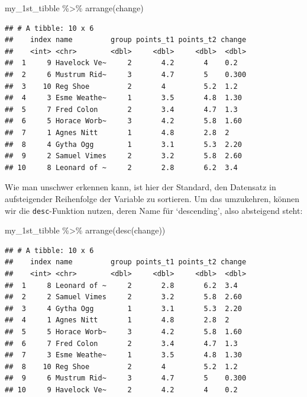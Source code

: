 \documentclass[
]{book}
\newenvironment{Shaded}{\begin{snugshade}}{\end{snugshade}}
\newcommand{\FunctionTok}[1]{\textcolor[rgb]{0.00,0.00,0.00}{#1}}
\newcommand{\NormalTok}[1]{#1}
\newcommand{\SpecialCharTok}[1]{\textcolor[rgb]{0.00,0.00,0.00}{#1}}
\begin{document}
\begin{Shaded}
\begin{Highlighting}[]
\NormalTok{my\_1st\_tibble }\SpecialCharTok{\%\textgreater{}\%} 
  \FunctionTok{arrange}\NormalTok{(change)}
\end{Highlighting}
\end{Shaded}

\begin{verbatim}
## # A tibble: 10 x 6
##    index name         group points_t1 points_t2 change
##    <int> <chr>        <dbl>     <dbl>     <dbl>  <dbl>
##  1     9 Havelock Ve~     2       4.2       4    0.2  
##  2     6 Mustrum Rid~     3       4.7       5    0.300
##  3    10 Reg Shoe         2       4         5.2  1.2  
##  4     3 Esme Weathe~     1       3.5       4.8  1.30 
##  5     7 Fred Colon       2       3.4       4.7  1.3  
##  6     5 Horace Worb~     3       4.2       5.8  1.60 
##  7     1 Agnes Nitt       1       4.8       2.8  2    
##  8     4 Gytha Ogg        1       3.1       5.3  2.20 
##  9     2 Samuel Vimes     2       3.2       5.8  2.60 
## 10     8 Leonard of ~     2       2.8       6.2  3.4
\end{verbatim}

Wie man unschwer erkennen kann, ist hier der Standard, den Datensatz in aufsteigender Reihenfolge der Variable zu sortieren. Um das umzukehren, können wir die \texttt{desc}-Funktion nutzen, deren Name für `descending', also absteigend steht:

\begin{Shaded}
\begin{Highlighting}[]
\NormalTok{my\_1st\_tibble }\SpecialCharTok{\%\textgreater{}\%} 
  \FunctionTok{arrange}\NormalTok{(}\FunctionTok{desc}\NormalTok{(change))}
\end{Highlighting}
\end{Shaded}

\begin{verbatim}
## # A tibble: 10 x 6
##    index name         group points_t1 points_t2 change
##    <int> <chr>        <dbl>     <dbl>     <dbl>  <dbl>
##  1     8 Leonard of ~     2       2.8       6.2  3.4  
##  2     2 Samuel Vimes     2       3.2       5.8  2.60 
##  3     4 Gytha Ogg        1       3.1       5.3  2.20 
##  4     1 Agnes Nitt       1       4.8       2.8  2    
##  5     5 Horace Worb~     3       4.2       5.8  1.60 
##  6     7 Fred Colon       2       3.4       4.7  1.3  
##  7     3 Esme Weathe~     1       3.5       4.8  1.30 
##  8    10 Reg Shoe         2       4         5.2  1.2  
##  9     6 Mustrum Rid~     3       4.7       5    0.300
## 10     9 Havelock Ve~     2       4.2       4    0.2
\end{verbatim}
\end{document}
